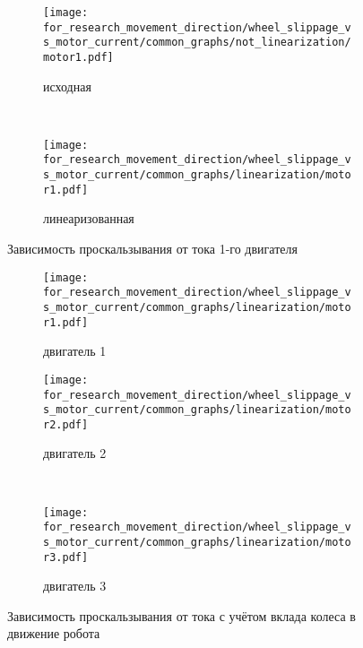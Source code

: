 \begin{figure}[H]
    \centering
    \begin{subfigure}{0.50\textwidth}
        \texttt{[image: for\_research\_movement\_direction/wheel\_slippage\_vs\_motor\_current/common\_graphs/not\_linearization/motor1.pdf]}
        \caption{исходная}
    \end{subfigure} \\
    \begin{subfigure}{0.50\textwidth}
        \texttt{[image: for\_research\_movement\_direction/wheel\_slippage\_vs\_motor\_current/common\_graphs/linearization/motor1.pdf]}
        \caption{линеаризованная}
    \end{subfigure}
    \caption{Зависимость проскальзывания от тока 1-го двигателя}
\end{figure}

\begin{figure}[H]
    \centering
    \begin{subfigure}{0.49\textwidth}
        \centering
        \texttt{[image: for\_research\_movement\_direction/wheel\_slippage\_vs\_motor\_current/common\_graphs/linearization/motor1.pdf]}
        \caption{двигатель 1}
    \end{subfigure}
    \hspace{0.005\textwidth}
    \begin{subfigure}{0.49\textwidth}
        \centering
        \texttt{[image: for\_research\_movement\_direction/wheel\_slippage\_vs\_motor\_current/common\_graphs/linearization/motor2.pdf]}
        \caption{двигатель 2}
    \end{subfigure} \\
    \vspace{4pt}
    \centering
    \begin{subfigure}{0.49\textwidth}
        \centering
        \texttt{[image: for\_research\_movement\_direction/wheel\_slippage\_vs\_motor\_current/common\_graphs/linearization/motor3.pdf]}
        \caption{двигатель 3}
    \end{subfigure}
    \caption{Зависимость проскальзывания от тока с учётом вклада колеса в движение робота}
\end{figure}